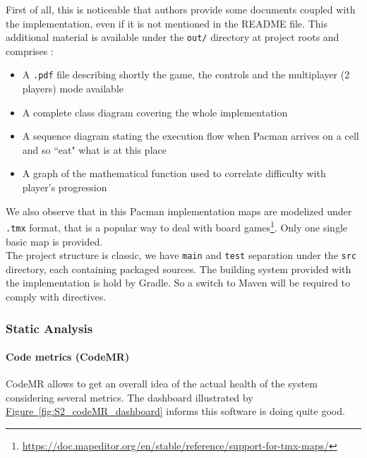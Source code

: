 \documentclass[]{article}
\newcommand{\wordlink}[2]{\hyperref[#2]{#1~\ref{#2}}}
\begin{document}
First of all, this is noticeable that authors provide some documents coupled with the implementation, even if it is not mentioned in the README file. This additional material is available under the \texttt{out/} directory at project roots and comprises :
\vspace{0.1cm}
\begin{itemize}
\item A \texttt{.pdf} file describing shortly the game, the controls and the multiplayer (2 players) mode available

\item A complete class diagram covering the whole implementation

\item A sequence diagram stating the execution flow when Pacman arrives on a cell and so ``eat" what is at this place

\item A graph of the mathematical function used to correlate difficulty with player's progression
\end{itemize}

We also observe that in this Pacman implementation maps are modelized under \texttt{.tmx} format, that is a popular way to deal with board games\footnote{\url{https://doc.mapeditor.org/en/stable/reference/support-for-tmx-maps/}}. Only one single basic map is provided.\\

The project structure is classic, we have \texttt{main} and \texttt{test} separation under the \texttt{src} directory, each containing packaged sources. The building system provided with the implementation is hold by Gradle. So a switch to Maven will be required to comply with directives.


\subsubsection{Static Analysis}

\paragraph{Code metrics (CodeMR)}

CodeMR allows to get an overall idea of the actual health of the system considering several metrics. The dashboard illustrated by \wordlink{Figure}{fig:S2_codeMR_dashboard} informs this software is doing quite good.
\end{document}
